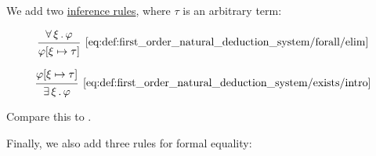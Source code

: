 \begin{definition}
\begin{thmenum}
     We add two \hyperref[def:judgment/inference_rule]{inference rules}, where \( \tau \) is an arbitrary term:

    \begin{minipage}{0.45\textwidth}
      \begin{equation*}\taglabel[\( \forall^- \)]{eq:def:first_order_natural_deduction_system/forall/elim}
        \begin{prooftree}
          \hypo{ \qforall \xi \varphi }
          \infer1[\ref{eq:def:first_order_natural_deduction_system/forall/elim}]{ \varphi[\xi \mapsto \tau] }
        \end{prooftree}
      \end{equation*}
    \end{minipage}
    \hfill
    \begin{minipage}{0.45\textwidth}
      \begin{equation*}\taglabel[\( \exists^+ \)]{eq:def:first_order_natural_deduction_system/exists/intro}
        \begin{prooftree}
          \hypo{ \varphi[\xi \mapsto \tau] }
          \infer1[\ref{eq:def:first_order_natural_deduction_system/exists/intro}]{ \qexists \xi \varphi }
        \end{prooftree}
      \end{equation*}
    \end{minipage}

    Compare this to .

     Finally, we also add three rules for formal equality:


\end{thmenum}
\end{definition}
